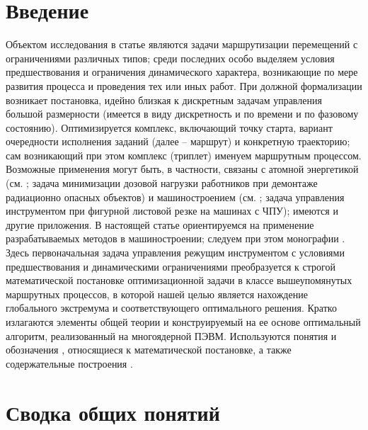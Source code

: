 \documentclass[10pt]{SPIIRAS_Proceedings}
\begin{document}
\maketitle

\normalsize

\section*{Введение}

Объектом исследования в статье
являются задачи маршрутизации перемещений
с ограничениями различных типов;
среди последних особо выделяем условия
предшествования и ограничения динамического характера,
возникающие по мере развития процесса и проведения тех или иных работ.
При должной формализации возникает постановка,
идейно близкая к дискретным задачам управления большой размерности
(имеется в виду дискретность и по времени и  по фазовому состоянию).
Оптимизируется комплекс, включающий точку старта,
вариант очередности исполнения заданий
(далее -- маршрут)
и конкретную траекторию;
сам возникающий при этом комплекс (триплет)
именуем маршрутным процессом.
Возможные применения могут быть,
в частности, связаны с атомной энергетикой
(см. \cite{1,2,3};
задача минимизации дозовой нагрузки работников при демонтаже радиационно опасных объектов)
и машиностроением (см. \cite{4,5,6};
задача управления инструментом при фигурной листовой резке на машинах с ЧПУ);
имеются и другие приложения.
В настоящей статье ориентируемся на применение разрабатываемых методов в машиностроении;
следуем при этом монографии \cite{4}.
Здесь первоначальная задача управления режущим инструментом
с условиями предшествования и динамическими ограничениями
преобразуется к строгой математической постановке
оптимизационной задачи в классе вышеупомянутых маршрутных процессов,
в которой нашей целью является нахождение
глобального экстремума и соответствующего оптимального решения.
Кратко излагаются элементы общей теории и
конструируемый на ее основе оптимальный алгоритм,
реализованный на многоядерной ПЭВМ.
Используются понятия и обозначения
\cite[часть II]{4},
относящиеся к математической постановке,
а также содержательные построения \cite[часть I]{4}.

\section{Сводка общих понятий}
\end{document}
